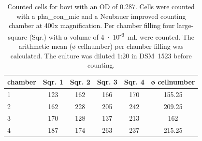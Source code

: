 \begin{table}[ht]
\centering
\caption[Counted cells for \acrlong{bovi} with an \acrshort{OD} of 0.287.]{Counted cells for \acrlong{bovi} with an \acrshort{OD} of 0.287. Cells were counted with a \gls{pha_con_mic} and a Neubauer improved counting chamber at 400x magnification. Per chamber filling four large-square (Sqr.) with a volume of 4~$\cdot$~10\textsuperscript{-6}~mL were counted. The arithmetic mean (ø cellnumber) per chamber filling was calculated. The culture was diluted 1:20 in DSM~1523 before counting.} 
\label{tab:cellnmr_bovi}
\begin{tabular}{lccccc}
  \toprule
chamber & Sqr. 1 & Sqr. 2 & Sqr. 3 & Sqr. 4 & ø cellnumber \\ 
  \midrule
1 & 123 & 162 & 166 & 170 & 155.25 \\ 
  2 & 162 & 228 & 205 & 242 & 209.25 \\ 
  3 & 170 & 128 & 137 & 213 & 162 \\ 
  4 & 187 & 174 & 263 & 237 & 215.25 \\ 
   \bottomrule
\end{tabular}
\end{table}
